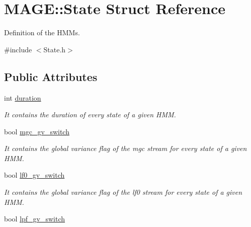 \hypertarget{struct_m_a_g_e_1_1_state}{\section{M\-A\-G\-E\-:\-:State Struct Reference}
\label{struct_m_a_g_e_1_1_state}
}


Definition of the H\-M\-Ms.  




{\ttfamily \#include $<$State.\-h$>$}

\subsection*{Public Attributes}
\begin{DoxyCompactItemize}
\item 
\hypertarget{struct_m_a_g_e_1_1_state_a374a7cb32876f8190f7ee541283f969a}{int \hyperlink{struct_m_a_g_e_1_1_state_a374a7cb32876f8190f7ee541283f969a}{duration}}\label{struct_m_a_g_e_1_1_state_a374a7cb32876f8190f7ee541283f969a}

\begin{DoxyCompactList}\small\item\em It contains the duration of every state of a given H\-M\-M. \end{DoxyCompactList}\item 
\hypertarget{struct_m_a_g_e_1_1_state_af71881812290585c3ea318251c0bb3f5}{bool \hyperlink{struct_m_a_g_e_1_1_state_af71881812290585c3ea318251c0bb3f5}{mgc\-\_\-gv\-\_\-switch}}\label{struct_m_a_g_e_1_1_state_af71881812290585c3ea318251c0bb3f5}

\begin{DoxyCompactList}\small\item\em It contains the global variance flag of the mgc stream for every state of a given H\-M\-M. \end{DoxyCompactList}\item 
\hypertarget{struct_m_a_g_e_1_1_state_a77240283e31e92076c73ecc0f9dbc34f}{bool \hyperlink{struct_m_a_g_e_1_1_state_a77240283e31e92076c73ecc0f9dbc34f}{lf0\-\_\-gv\-\_\-switch}}\label{struct_m_a_g_e_1_1_state_a77240283e31e92076c73ecc0f9dbc34f}

\begin{DoxyCompactList}\small\item\em It contains the global variance flag of the lf0 stream for every state of a given H\-M\-M. \end{DoxyCompactList}\item 
\hypertarget{struct_m_a_g_e_1_1_state_a174dfed9ae24aff59d3f69d0733478e5}{bool \hyperlink{struct_m_a_g_e_1_1_state_a174dfed9ae24aff59d3f69d0733478e5}{lpf\-\_\-gv\-\_\-switch}}\label{struct_m_a_g_e_1_1_state_a174dfed9ae24aff59d3f69d0733478e5}


\end{DoxyCompactItemize}
